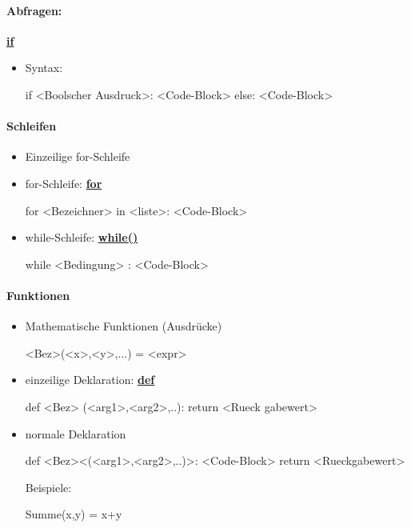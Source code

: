\documentclass[a4paper,9pt,DIV15,twocolumn]{scrartcl}
\begin{document}
{\paragraph{Abfragen:} \href{http://docs.python.org/reference/compound_stmts.html#the-if-statement}{\textbf{if}}
\begin{itemize}
 \item  Syntax: \begin{sageinsmall}
if <Boolscher Ausdruck>:
    <Code-Block>
else:
    <Code-Block>
\end{sageinsmall}
\end{itemize}

\paragraph{Schleifen}
\begin{itemize}
\item Einzeilige for-Schleife
    \begin{sageinsmall}
    \end{sageinsmall}
\item for-Schleife: \href{http://docs.python.org/tutorial/controlflow.html#for-statements}{\textbf{for}}
    \begin{sageinsmall}
for <Bezeichner> in <liste>:
    <Code-Block>
    \end{sageinsmall}
  \item while-Schleife: \href{http://docs.python.org/reference/compound_stmts.html#the-while-statement}{\textbf{while()}}
\begin{sageinsmall}
while <Bedingung> :
    <Code-Block>
\end{sageinsmall}
\end{itemize}

\paragraph{Funktionen}
\begin{itemize}
 \item Mathematische Funktionen (Ausdrücke)
\begin{sageinsmall}
<Bez>(<x>,<y>,...) = <expr>
\end{sageinsmall}
    \item einzeilige Deklaration: \href{http://docs.python.org/reference/compound_stmts.html#function-definitions}{\textbf{def}}     
        \begin{sageinsmall}
def <Bez> (<arg1>,<arg2>,..): return <Rueck gabewert>            
        \end{sageinsmall}
 \item normale Deklaration
\begin{sageinsmall}
def <Bez><(<arg1>,<arg2>,..)>:
    <Code-Block>
    return <Rueckgabewert>
\end{sageinsmall}
Beispiele:
\begin{sageinsmall}
Summe(x,y) = x+y


\end{sageinsmall}
\end{itemize}}
\end{document}
